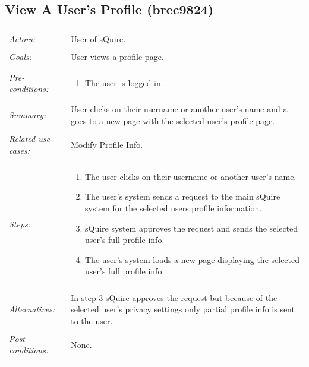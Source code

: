\documentclass[11pt]{report}
\begin{document}
\subsection{View A User's Profile (brec9824)}
\begin{tabular}{ p{2cm} p{12cm} }
 \hline
 \\
 \textit{Actors:} & User of sQuire. \\ 
 \\
 \textit{Goals:} & User views a profile page. \\
 \\
 \textit{Pre-conditions:} & \begin{enumerate}
  \item The user is logged in.
 \end{enumerate} \\
 \\
 \textit{Summary:} & User clicks on their username or another user's name and a goes to a new page with the selected user's profile page.\\ 
 \\
 \textit{Related use cases:} & Modify Profile Info. \\ 
 \\
 \textit{Steps:} & \begin{enumerate}
  \item The user clicks on their username or another user's name.
  \item The user's system sends a request to the main sQuire system for the selected users profile information.
  \item sQuire system approves the request and sends the selected user's full profile info.
  \item The user's system loads a new page displaying the selected user's full profile info.
 \end{enumerate} \\
 \\
 \textit{Alternatives:} & In step 3 sQuire approves the request but because of the selected user's privacy settings only partial profile info is sent to the user. \\
 \\
 \textit{Post-conditions:} & None. \\
 \\
\hline
\end{tabular}
\end{document}
